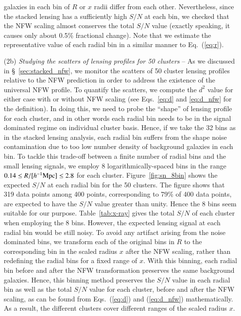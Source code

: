 \documentclass[iop, apj]{emulateapj}
\newcommand{\?}{\stackrel{?}{=}}
\begin{document}
\begin{itemize}
	    galaxies in each bin of $R$ or $x$ radii differ from each
	    other. Nevertheless, since the stacked lensing has a sufficiently high
	    $S/N$ at each bin, we checked that the NFW scaling almost
	    conserves the total $S/N$ value (exactly speaking, it causes
	    only about 0.5\% fractional change).  Note that we estimate
	    the representative value of each radial bin in a similar
	    manner to Eq.~(\ref{eq:r}).
 \item[(2b)] {\it Studying the scatters of lensing profiles for 50 clusters}
       -- As we discussed in \S~\ref{sec:stacked_nfw}, we monitor the
	    scatters of 50 cluster lensing profiles relative to the NFW
	    prediction in order to address the existence of the
	    universal NFW profile. To quantify the scatters, we compute
	    the $d^2$ value for either case with or without NFW scaling
	    (see Eqs.~\ref{eq:d} and \ref{eq:d_nfw} for the
	    definition). In doing this, we need to probe the ``shape''
	    of lensing profile for each cluster, and in other words each
	    radial bin needs to be in the signal dominated regime on
	    individual cluster basis.  Hence, if we take the 32 bins as
	    in the stacked lensing analysis, each radial bin suffers
	    from the shape noise contamination due to too low number
	    density of background galaxies in each bin.  To tackle this
	    trade-off between a finite number of radial bins and the
	    small lensing signals, we employ 8 logarithmically-spaced
	    bins in the range $0.14\le R/[h^{-1}{\rm Mpc}]\le 2.8$ for
	    each cluster. Figure~\ref{fig:sn_8bin} shows the expected
	    $S/N$ at each radial bin for the 50 clusters. The figure
	    shows that 319 data points among 400 points, corresponding
	    to 79\% of 400 data points, are expected to have the $S/N$
	    value greater than unity. Hence the 8 bins seem suitable for
	    our purpose. Table~\ref{tab:x-ray} gives the total
	    $S/N$ of each cluster when employing the 8 bins.  However,
	    the expected lensing signal at each radial bin would be
	    still noisy. To avoid any artifact arising from the noise
	    dominated bins, we transform each of the original bins in
	    $R$ to the corresponding bin in the scaled radius $x$ after
	    the NFW scaling, rather than redefining the radial bins for
	    a fixed range of $x$. With this binning, each radial bin
	    before and after the NFW transformation preserves the same
	    background galaxies. Hence, this binning method preserves
	    the $S/N$ value in each radial bin as well as the total
	    $S/N$ value for each cluster, before and after the NFW
	    scaling, as can be found from Eqs.~(\ref{eq:d}) and
	    (\ref{eq:d_nfw}) mathematically. As a result, the different
	    clusters cover different ranges of the scaled radius $x$.
\end{itemize}
\end{document}

